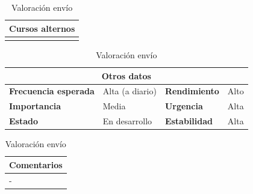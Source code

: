 \documentclass[12pt,spanish]{article}
\begin{document}
\begin{table}[H]
\vspace{1cm}

\begin{tabular}{|m{10pt}|m{7.15cm}|m{10pt}|m{7.15cm}|}
\hline
\multicolumn{4}{|m{16.2cm}|}{\textbf{Cursos alternos}} \\
\hline
&&&\\
\hline
\end{tabular}

\vspace{1cm}

\begin{tabular}{|m{3.72cm}|m{3.72cm}|m{3.72cm}|m{3.72cm}|}
\hline
\multicolumn{4}{|c|}{\textbf{Otros datos}} \\
\hline
\textbf{Frecuencia esperada} & Alta (a diario) & \textbf{Rendimiento} & Alto \\
\hline
\textbf{Importancia} & Media & \textbf{Urgencia} & Alta \\
\hline
\textbf{Estado} & En desarrollo & \textbf{Estabilidad} & Alta \\
\hline
\end{tabular}

\vspace{1cm}

\begin{tabular}{|m{16.2cm}|}
\hline
\textbf{Comentarios} \\
\hline
- \\
\hline
\end{tabular}

\caption{Valoración envío}

\end{table}

\end{document}
